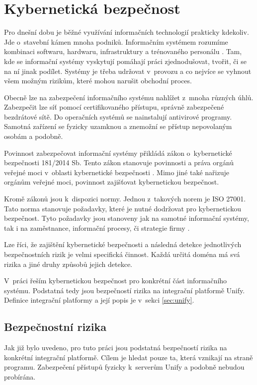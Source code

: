 \documentclass[thesis=M,czech]{FITthesis}[2012/10/20]
\begin{document}
	
	\section{Kybernetická bezpečnost}
		Pro dnešní dobu je běžné využívání informačních technologií prakticky kdekoliv. Jde o~stavební kámen mnoha podniků. Informačním systémem rozumíme kombinaci softwaru, hardwaru, infrastruktury a trénovaného personálu \cite{businessdictionary}. Tam, kde  se informační systémy vyskytují pomáhají práci zjednodušovat, tvořit, či se na ní jinak podílet. Systémy je třeba udržovat v~provozu a co nejvíce se vyhnout všem možným rizikům, které mohou narušit obchodní proces.
		
		Obecně lze na zabezpečení informačního systému nahlížet z~mnoha různých úhlů. Zabezpečit lze síť pomocí certifikovaného přístupu, správně zabezpečené bezdrátové sítě. Do operačních systémů se nainstalují antivirové programy. Samotná zařízení se fyzicky uzamknou a znemožní se přístup nepovolaným osobám  a podobně.
		
		Povinnost zabezpečovat informační systémy přikládá zákon o~kybernetické bezpečnosti 181/2014 Sb. Tento zákon stanovuje povinnosti a práva orgánů veřejné moci v~oblasti kybernetické bezpečnosti \cite{zakon181-2014}. Mimo jiné také nařizuje orgánům veřejné moci, povinnost zajišťovat kybernetickou bezpečnost.
		
		Kromě zákonů jsou k~dispozici normy. Jednou z~takových norem je ISO 27001. Tato norma stanovuje požadavky, které je nutné dodržovat pro kybernetickou bezpečnost. Tyto požadavky jsou stanoveny jak na samotné informační systémy, tak i na zaměstnance, informační procesy, či strategie firmy \cite{iso27001}.
		
		Lze říci, že zajištění kybernetické bezpečnosti a následná detekce jednotlivých bezpečnostních rizik je velmi specifická činnost. Každá určitá doména má svá rizika a jiné druhy způsobů jejich detekce. 
		
		V~práci řeším kybernetickou bezpečnost pro konkrétní část informačního systému. Podstatná tedy jsou bezpečností rizika na integrační platformě Unify. Definice integrační platformy a její popis je v~sekci \ref{sec:unify}.
		
		\subsection{Bezpečnostní rizika}
			Jak již bylo uvedeno, pro tuto práci jsou podstatná bezpečností rizika na konkrétní integrační platformě. Cílem je hledat pouze ta, která vznikají na straně programu. Zabezpečení přístupů fyzicky k~serverům Unify a podobně nebudou probírána.
			
\end{document}
